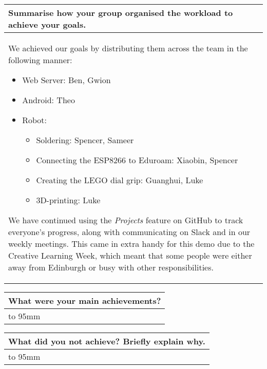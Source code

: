 \documentclass[a4paper]{article}
\newcommand{\colWidth}{141mm}
\begin{document}
\begin{center}
\begin{tabular}{|p{\colWidth}|}
	\hline
\end{tabular}
\vskip 5mm


\begin{tabular}{|p{\colWidth}|}
	\hline
	\cellcolor{blue!25}\large
	\textbf{Summarise how your group organised the workload to achieve your goals.}
	\\ \hline
	
		We achieved our goals by distributing them across the team in the following manner:
		\begin{itemize}
			\item Web Server: Ben, Gwion
			\item Android: Theo
			\item Robot:
			\begin{itemize}
				\item Soldering: Spencer, Sameer
				\item Connecting the ESP8266 to Eduroam: Xiaobin, Spencer
				\item Creating the LEGO dial grip: Guanghui, Luke
				\item 3D-printing: Luke
			\end{itemize}
		\end{itemize}

		We have continued using the \textit{Projects} feature on GitHub to track everyone's progress, along with communicating on Slack and in our weekly meetings.
		This came in extra handy for this demo due to the Creative Learning Week, which meant that some people were either away from Edinburgh or busy with other responsibilities.
	}
	
  \\
  \hline
\end{tabular}
\vskip 5mm


\begin{tabular}{|p{\colWidth}|}
	\hline
	\cellcolor{blue!25}\large
	\textbf{What were your main achievements?}
	\\ \hline
	\vtop to 95mm{
	
	}
  \\
  \hline
\end{tabular}
\vskip 5mm


\begin{tabular}{|p{\colWidth}|}
	\hline
	\cellcolor{blue!25}\large
	\textbf{What did you not achieve? Briefly explain why.}
	\\ \hline
	\vtop to 95mm{

}
\end{tabular}
\end{center}
\end{document}
